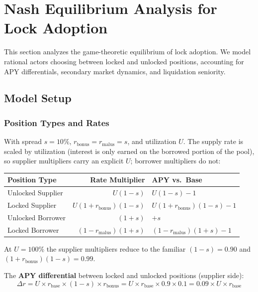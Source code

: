 \documentclass[10pt,a4paper,twocolumn]{article}
\begin{document}
\section{Nash Equilibrium Analysis for Lock Adoption}
\label{apx:nash}

This section analyzes the game-theoretic equilibrium of lock adoption. We model rational actors choosing between locked and unlocked positions, accounting for APY differentials, secondary market dynamics, and liquidation seniority.

\subsection{Model Setup}

\subsubsection{Position Types and Rates}

With spread $s = 10\%$, $r_{\text{bonus}} = r_{\text{malus}} = s$, and utilization $U$. The supply rate is scaled by utilization (interest is only earned on the borrowed portion of the pool), so supplier multipliers carry an explicit $U$; borrower multipliers do not:

\begin{center}
\small
\begin{tabularx}{0.95\columnwidth}{@{}l r >{\raggedleft\arraybackslash}X@{}}
\toprule
Position Type & Rate Multiplier & APY vs.\ Base \\
\midrule
Unlocked Supplier & $U(1-s)$ & $U(1-s)-1$ \\
Locked Supplier & $U(1+r_{\text{bonus}})(1-s)$ & $U(1+r_{\text{bonus}})(1-s)-1$ \\
Unlocked Borrower & $(1+s)$ & $+s$ \\
Locked Borrower & $(1-r_{\text{malus}})(1+s)$ & $(1-r_{\text{malus}})(1+s)-1$ \\
\bottomrule
\end{tabularx}
\end{center}

At $U = 100\%$ the supplier multipliers reduce to the familiar $(1-s) = 0.90$ and $(1+r_{\text{bonus}})(1-s) = 0.99$.

The \textbf{APY differential} between locked and unlocked positions (supplier side):
\begin{equation}
\Delta r = U \times r_{\text{base}} \times (1-s) \times r_{\text{bonus}} = U \times r_{\text{base}} \times 0.9 \times 0.1 = 0.09 \times U \times r_{\text{base}}
\end{equation}
\end{document}
